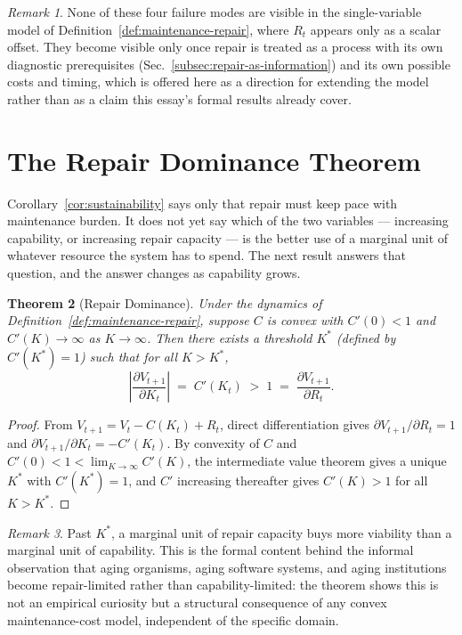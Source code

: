 \documentclass[11pt,a4paper]{article}
\theoremstyle{plain}
\newtheorem{theorem}{Theorem}[section]
\theoremstyle{definition}
\theoremstyle{remark}
\newtheorem{remark}[theorem]{Remark}
\begin{document}
\begin{remark}
None of these four failure modes are visible in the single-variable model of Definition~\ref{def:maintenance-repair}, where $R_t$ appears only as a scalar offset. They become visible only once repair is treated as a process with its own diagnostic prerequisites (Sec.~\ref{subsec:repair-as-information}) and its own possible costs and timing, which is offered here as a direction for extending the model rather than as a claim this essay's formal results already cover.
\end{remark}

\section{The Repair Dominance Theorem}
\label{sec:repair-dominance}

Corollary~\ref{cor:sustainability} says only that repair must keep pace with maintenance burden. It does not yet say which of the two variables — increasing capability, or increasing repair capacity — is the better use of a marginal unit of whatever resource the system has to spend. The next result answers that question, and the answer changes as capability grows.

\begin{theorem}[Repair Dominance]
\label{thm:repair-dominance}
Under the dynamics of Definition~\ref{def:maintenance-repair}, suppose $C$ is convex with $C'(0) < 1$ and $C'(K) \to \infty$ as $K \to \infty$. Then there exists a threshold $K^\ast$ (defined by $C'(K^\ast) = 1$) such that for all $K > K^\ast$,
\[
\left| \frac{\partial V_{t+1}}{\partial K_t} \right| \;=\; C'(K_t) \;>\; 1 \;=\; \frac{\partial V_{t+1}}{\partial R_t}.
\]
\end{theorem}

\begin{proof}
From $V_{t+1} = V_t - C(K_t) + R_t$, direct differentiation gives $\partial V_{t+1}/\partial R_t = 1$ and $\partial V_{t+1}/\partial K_t = -C'(K_t)$. By convexity of $C$ and $C'(0)<1<\lim_{K\to\infty}C'(K)$, the intermediate value theorem gives a unique $K^\ast$ with $C'(K^\ast)=1$, and $C'$ increasing thereafter gives $C'(K)>1$ for all $K>K^\ast$.
\end{proof}

\begin{remark}
Past $K^\ast$, a marginal unit of repair capacity buys more viability than a marginal unit of capability. This is the formal content behind the informal observation that aging organisms, aging software systems, and aging institutions become repair-limited rather than capability-limited: the theorem shows this is not an empirical curiosity but a structural consequence of any convex maintenance-cost model, independent of the specific domain.
\end{remark}
\end{document}
